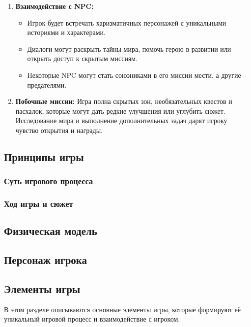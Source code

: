\documentclass{article}
\begin{document}
\begin{enumerate}
    \item \textbf{Взаимодействие с NPC:}  
    \begin{itemize}
        \item Игрок будет встречать харизматичных персонажей с уникальными историями и характерами.
        \item Диалоги могут раскрыть тайны мира, помочь герою в развитии или открыть доступ к скрытым миссиям.
        \item Некоторые NPC могут стать союзниками в его миссии мести, а другие – предателями.
    \end{itemize}
    \item \textbf{Побочные миссии:}  
    Игра полна скрытых зон, необязательных квестов и пасхалок, которые могут дать редкие улучшения или углубить сюжет.  
    Исследование мира и выполнение дополнительных задач дарят игроку чувство открытия и награды.
\end{enumerate}



\subsection{Принципы игры}

\subsubsection{Суть игрового процесса}

\subsubsection{Ход игры и сюжет}

\subsection{Физическая модель}

\subsection{Персонаж игрока}

\subsection{Элементы игры}

В этом разделе описываются основные элементы игры, которые формируют её уникальный игровой процесс и взаимодействие с игроком.
\end{document}

